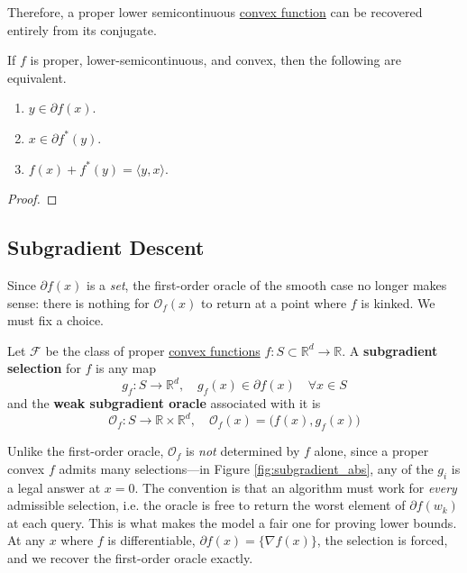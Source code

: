 	Therefore, a proper lower semicontinuous \hyperref[mt-def:convex-function]{convex function} can be recovered entirely from its conjugate. 

	\begin{theorem}
	  \label{thm:reciprocity-of-subgradients}
	  If $f$ is proper, lower-semicontinuous, and convex, then the following are equivalent. 
		\begin{enumerate}
		  \item $y \in \partial f(x)$. 
			\item $x \in \partial f^\ast (y)$. 
			\item $f(x) + f^\ast (y) = \langle y, x \rangle$. 
		\end{enumerate}
	\end{theorem}
	\begin{proof}
	  
	\end{proof}

\subsection{Subgradient Descent}

	Since $\partial f(x)$ is a \textit{set}, the first-order oracle of the smooth case no longer makes sense: there is nothing for $\mathcal{O}_f(x)$ to return at a point where $f$ is kinked. We must fix a choice.

	\begin{definition}
		\label{def:weak_subgradient_oracle}
		Let $\mathcal{F}$ be the class of proper \hyperref[mt-def:convex-function]{convex functions} $f : S \subset \mathbb{R}^d \to \mathbb{R}$. A \textbf{subgradient selection} for $f$ is any map
		\begin{equation}
			g_f : S \to \mathbb{R}^d, \quad g_f(x) \in \partial f(x) \quad \forall x \in S
		\end{equation}
		and the \textbf{weak subgradient oracle} associated with it is
		\begin{equation}
			\mathcal{O}_f : S \to \mathbb{R} \times \mathbb{R}^d, \quad \mathcal{O}_f (x) = \big( f(x), g_f(x) \big)
		\end{equation}
	\end{definition}

	Unlike the first-order oracle, $\mathcal{O}_f$ is \textit{not} determined by $f$ alone, since a proper convex $f$ admits many selections---in Figure \ref{fig:subgradient_abs}, any of the $g_i$ is a legal answer at $x = 0$. The convention is that an algorithm must work for \textit{every} admissible selection, i.e. the oracle is free to return the worst element of $\partial f(w_k)$ at each query. This is what makes the model a fair one for proving lower bounds. At any $x$ where $f$ is differentiable, $\partial f(x) = \{\nabla f(x)\}$, the selection is forced, and we recover the first-order oracle exactly.

